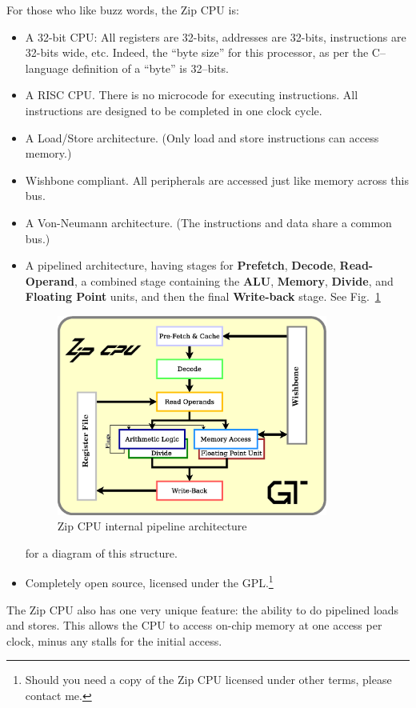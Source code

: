 \documentclass{gqtekspec}
\begin{document}
For those who like buzz words, the Zip CPU is:
\begin{itemize}
\item A 32-bit CPU: All registers are 32-bits, addresses are 32-bits,
		instructions are 32-bits wide, etc.  Indeed, the ``byte size''
		for this processor, as per the C--language definition of a
		``byte'' is 32--bits.
\item A RISC CPU.  There is no microcode for executing instructions.  All
	instructions are designed to be completed in one clock cycle.
\item A Load/Store architecture.  (Only load and store instructions
		can access memory.)
\item Wishbone compliant.  All peripherals are accessed just like
		memory across this bus.
\item A Von-Neumann architecture.  (The instructions and data share a 
		common bus.)
\item A pipelined architecture, having stages for {\bf Prefetch},
	{\bf Decode}, {\bf Read-Operand}, a combined stage containing
	the {\bf ALU}, {\bf Memory}, {\bf Divide}, and {\bf Floating Point}
	units, and then the final {\bf Write-back} stage. 
		See Fig.~\ref{fig:cpu}
\begin{figure}\begin{center}
\includegraphics[width=3.5in]{../gfx/cpu.eps}
\caption{Zip CPU internal pipeline architecture}\label{fig:cpu}
\end{center}\end{figure}
		for a diagram of this structure.
\item Completely open source, licensed under the GPL.\footnote{Should you
	need a copy of the Zip CPU licensed under other terms, please 
	contact me.}
\end{itemize}

The Zip CPU also has one very unique feature: the ability to do pipelined loads
and stores.  This allows the CPU to access on-chip memory at one access per
clock, minus any stalls for the initial access.
\end{document}
